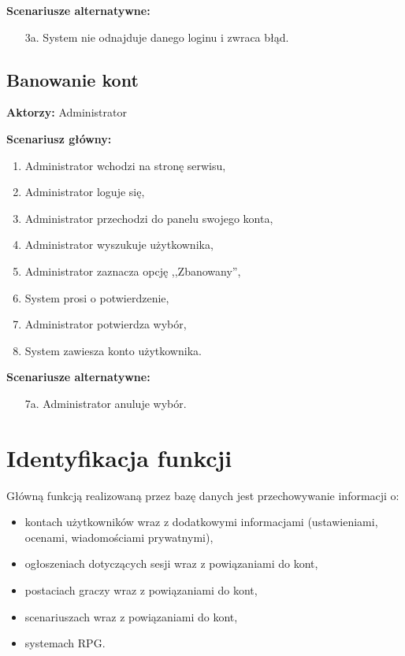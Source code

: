 \textbf{Scenariusze alternatywne:}
	\begin{enumerate}
	\item[3a.] System nie odnajduje danego loginu i zwraca błąd.
	\end{enumerate}

\subsection*{Banowanie kont}

\textbf{Aktorzy:} Administrator

\textbf{Scenariusz główny:}
	\begin{enumerate}
	\item Administrator wchodzi na stronę serwisu,
	\item Administrator loguje się,
	\item Administrator przechodzi do panelu swojego konta,
	\item Administrator wyszukuje użytkownika,
	\item Administrator zaznacza opcję ,,Zbanowany'',
	\item System prosi o potwierdzenie,
	\item Administrator potwierdza wybór,	
	\item System zawiesza konto użytkownika.
	\end{enumerate}

\textbf{Scenariusze alternatywne:}
	\begin{enumerate}
	\item[7a.] Administrator anuluje wybór.
	\end{enumerate}


\section{Identyfikacja funkcji}
\label{sec:idfun}

Główną funkcją realizowaną przez bazę danych jest przechowywanie informacji o:
	\begin{itemize}
	\item kontach użytkowników wraz z dodatkowymi informacjami (ustawieniami, ocenami, wiadomościami prywatnymi),
	\item ogłoszeniach dotyczących sesji wraz z powiązaniami do kont,
	\item postaciach graczy wraz z powiązaniami do kont,
	\item scenariuszach wraz z powiązaniami do kont,
	\item systemach RPG.
	\end{itemize}

